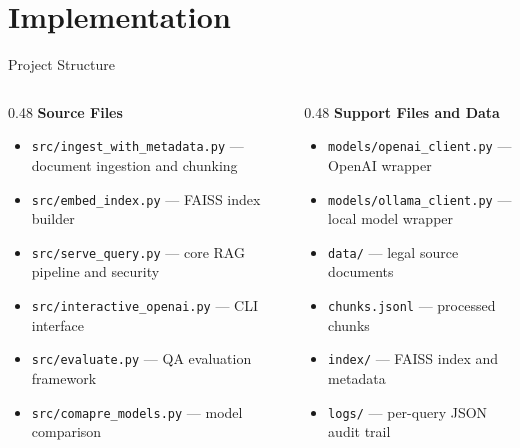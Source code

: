 \documentclass[aspectratio=169]{beamer}
\begin{document}
\section{Implementation}
\begin{frame}{Project Structure}
    \small
    \begin{columns}[t]
        \begin{column}{0.48\textwidth}
            \textbf{Source Files}
            \begin{itemize}
                \item \texttt{src/ingest\_with\_metadata.py} --- document ingestion and chunking
                \item \texttt{src/embed\_index.py} --- FAISS index builder
                \item \texttt{src/serve\_query.py} --- core RAG pipeline and security
                \item \texttt{src/interactive\_openai.py} --- CLI interface
                \item \texttt{src/evaluate.py} --- QA evaluation framework
                \item \texttt{src/comapre\_models.py} --- model comparison
            \end{itemize}
        \end{column}
        \begin{column}{0.48\textwidth}
            \textbf{Support Files and Data}
            \begin{itemize}
                \item \texttt{models/openai\_client.py} --- OpenAI wrapper
                \item \texttt{models/ollama\_client.py} --- local model wrapper
                \item \texttt{data/} --- legal source documents
                \item \texttt{chunks.jsonl} --- processed chunks
                \item \texttt{index/} --- FAISS index and metadata
                \item \texttt{logs/} --- per-query JSON audit trail
            \end{itemize}
        \end{column}
    \end{columns}
\end{frame}
\end{document}
